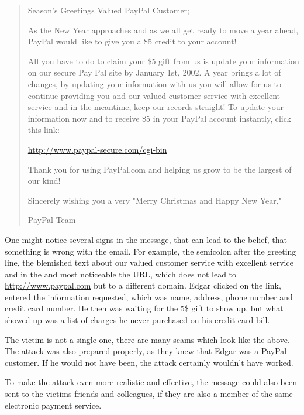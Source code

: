 \begin{quote}
Season's Greetings Valued PayPal Customer;

As the New Year approaches and as we all get ready to move a year ahead,
PayPal would like to give you a \$5 credit to your account!

All you have to do to claim your \$5 gift from us is update your information on
our secure Pay Pal site by January 1st, 2002. A year brings a lot of changes,
by updating your information with us you will allow for us to continue
providing you and our valued customer service with excellent service and in the
meantime, keep our records straight! To update your information now and to
receive \$5 in your PayPal account instantly, click this link:

\url{http://www.paypal-secure.com/cgi-bin}

Thank you for using PayPal.com and helping us grow to be the largest of our
kind!

Sincerely wishing you a very "Merry Christmas and Happy New Year,"

PayPal Team

\end{quote}

One might notice several signs in the message, that can lead to the belief,
that something is wrong with the email. For example, the semicolon after the
greeting line, the blemished text about 
\glqq{}our valued customer service with excellent service and in the\grqq{} and
most noticeable the URL, which does not lead to \url{http://www.paypal.com} but
to a different domain. Edgar clicked on the link, entered the information
requested, which was name, address, phone number and credit card number. He
then was waiting for the 5\$ gift to show up, but what showed up was a list of
charges he never purchased on his credit card bill.

The victim is not a single one, there are many scams which look like the above.
The attack was also prepared properly, as they knew that Edgar was a PayPal
customer. If he would not have been, the attack certainly wouldn't have worked.

To make the attack even more realistic and effective, the message could also
been sent to the victims friends and colleagues, if they are also a member of
the same electronic payment service.

